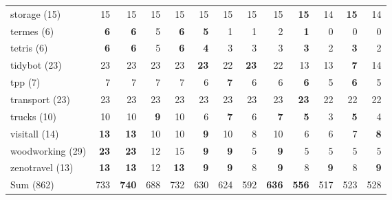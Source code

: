 \begin{tabular}{l|rr:rr|rr:rr|rr:rr}
	storage (15) & 15 & 15 & 15 & 15 & 15 & 15 & 15 & 15 & \textbf{15}  & 14 & \textbf{15}  & 14\\
	termes (6) & \textbf{6}  & \textbf{6}  & 5 & \textbf{6}  & \textbf{5}  & 1 & 1 & 2 & \textbf{1}  & 0 & 0 & 0\\
	tetris (6) & \textbf{6}  & \textbf{6}  & 5 & \textbf{6}  & \textbf{4}  & 3 & 3 & 3 & \textbf{3}  & 2 & \textbf{3}  & 2\\
	tidybot (23) & 23 & 23 & 23 & 23 & \textbf{23}  & 22 & \textbf{23}  & 22 & 13 & 13 & \textbf{7}  & 14\\
	tpp (7) & 7 & 7 & 7 & 7 & 6 & \textbf{7}  & 6 & 6 & \textbf{6}  & 5 & \textbf{6}  & 5\\
	transport (23) & 23 & 23 & 23 & 23 & 23 & 23 & 23 & 23 & \textbf{23}  & 22 & 22 & 22\\
	trucks (10) & 10 & 10 & \textbf{9}  & 10 & 6 & \textbf{7}  & 6 & \textbf{7}  & \textbf{5}  & 3 & \textbf{5}  & 4\\
	visitall (14) & \textbf{13}  & \textbf{13}  & 10 & 10 & \textbf{9}  & 10 & 8 & 10 & 6 & 6 & 7 & \textbf{8} \\
	woodworking (29) & \textbf{23}  & \textbf{23}  & 12 & 15 & \textbf{9}  & \textbf{9}  & 5 & \textbf{9}  & 5 & 5 & 5 & 5\\
	zenotravel (13) & \textbf{13}  & \textbf{13}  & 12 & \textbf{13}  & \textbf{9}  & \textbf{9}  & 8 & \textbf{9}  & 8 & \textbf{9}  & 8 & \textbf{9} \\\hline
	Sum (862) & 733 & \textbf{740}  & 688 & 732 & 630 & 624 & 592 & \textbf{636}  & \textbf{556}  & 517 & 523 & 528\\
\end{tabular}
